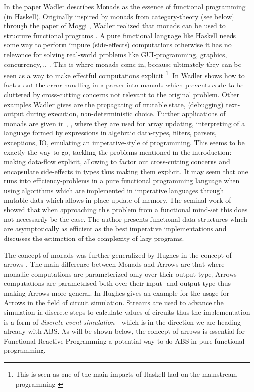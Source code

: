 In the paper \cite{wadler_essence_1992} Wadler describes Monads as the essence of functional programming (in Haskell). Originally inspired by monads from category-theory (see below) through the paper of Moggi \cite{moggi_computational_1989}, Wadler realized that monads can be used to structure functional programs \cite{wadler_comprehending_1990}. A pure functional language like Haskell needs some way to perform impure (side-effects) computations otherwise it has no relevance for solving real-world problems like GUI-programming, graphics, concurrency,... . This is where monads come in, because ultimately they can be seen as a way to make effectful computations explicit \footnote{This is seen as one of the main impacts of Haskell had on the mainstream programming \cite{hudak_history_2007}}. 
In \cite{wadler_essence_1992} Wadler shows how to factor out the error handling in a parser into monads which prevents code to be cluttered by cross-cutting concerns not relevant to the original problem. Other examples Wadler gives are the propagating of mutable state, (debugging) text-output during execution, non-deterministic choice. Further applications of monads are given in \cite{wadler_essence_1992}, \cite{wadler_monads_1995}, \cite{wadler_how_1997} where they are used for array updating, interpreting of a language formed by expressions in algebraic data-types, filters, parsers, exceptions, IO, emulating an imperative-style of programming. This seems to be exactly the way to go, tackling the problems mentioned in the introduction: making data-flow explicit, allowing to factor out cross-cutting concerns and encapsulate side-effects in types thus making them explicit.
It may seem that one runs into efficiency-problems in a pure functional programming language when using algorithms which are implemented in imperative languages through mutable data which allows in-place update of memory. The seminal work of \cite{okasaki_purely_1999} showed that when approaching this problem from a functional mind-set this does not necessarily be the case. The author presents functional data structures which are asymptotically as efficient as the best imperative implementations and discusses the estimation of the complexity of lazy programs.

The concept of monads was further generalized by Hughes in the concept of arrows \cite{hughes_generalising_2000}. The main difference between Monads and Arrows are that where monadic computations are parameterized only over their output-type, Arrows computations are parametrised both over their input- and output-type thus making Arrows more general. In \cite{hughes_programming_2005} Hughes gives an example for the usage for Arrows in the field of circuit simulation. Streams are used to advance the simulation in discrete steps to calculate values of circuits thus the implementation is a form of \textit{discrete event simulation} - which is in the direction we are heading already with ABS. As will be shown below, the concept of arrows is essential for Functional Reactive Programming a potential way to do ABS in pure functional programming.

